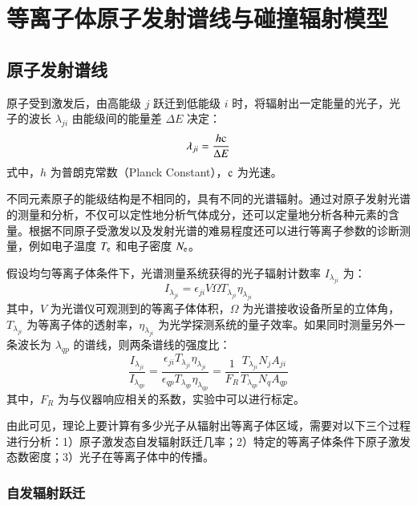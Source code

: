 ﻿\graphicspath{{figures/chap02/}}

\chapter{等离子体原子发射谱线与碰撞辐射模型}
\label{chap:crm-intro}

\section{原子发射谱线}

原子受到激发后，由高能级 $j$ 跃迁到低能级 $i$ 时，将辐射出一定能量的光子，光子的波长 $\lambda_{ji}$ 由能级间的能量差 $\Delta E$ 决定：
\begin{equation}
  \lambda_{ji} = \frac{h{\rm c}}{\Delta E}
\end{equation}
式中，$h$ 为普朗克常数（Planck Constant），${\rm c}$ 为光速。

不同元素原子的能级结构是不相同的，具有不同的光谱辐射。通过对原子发射光谱的测量和分析，不仅可以定性地分析气体成分，还可以定量地分析各种元素的含量。根据不同原子受激发以及发射光谱的难易程度还可以进行等离子参数的诊断测量，例如电子温度 $T_{\rm e}$ 和电子密度 $N_{\rm e}$。

假设均匀等离子体条件下，光谱测量系统获得的光子辐射计数率 $I_{\lambda_{ji}}$ 为：
\begin{equation}
  I_{\lambda_{ji}}=\epsilon_{ji}V\Omega T_{\lambda_{ji}}\eta_{\lambda_{ji}}
\end{equation}
其中，$V$ 为光谱仪可观测到的等离子体体积，$\Omega$ 为光谱接收设备所呈的立体角，$T_{\lambda_{ji}}$ 为等离子体的透射率，$\eta_{\lambda_{ji}}$ 为光学探测系统的量子效率。如果同时测量另外一条波长为 $\lambda_{qp}$ 的谱线，则两条谱线的强度比：
\begin{equation}
\label{eq:chap02:line-ratio}
  \frac{I_{\lambda_{ji}}}{I_{\lambda_{qp}}}=
  \frac{\epsilon_{ji}T_{\lambda_{ji}}\eta_{\lambda_{ji}}}{\epsilon_{qp}T_{\lambda_{qp}}\eta_{\lambda_{qp}}}
  =\frac{1}{F_R}\frac{T_{\lambda_{ji}}N_jA_{ji}}{T_{\lambda_{qp}}N_qA_{qp}}
\end{equation}
其中，$F_R$ 为与仪器响应相关的系数，实验中可以进行标定。

由此可见，理论上要计算有多少光子从辐射出等离子体区域，需要对以下三个过程进行分析：1）原子激发态自发辐射跃迁几率；2）特定的等离子体条件下原子激发态数密度；3）光子在等离子体中的传播。

\subsection{自发辐射跃迁}

